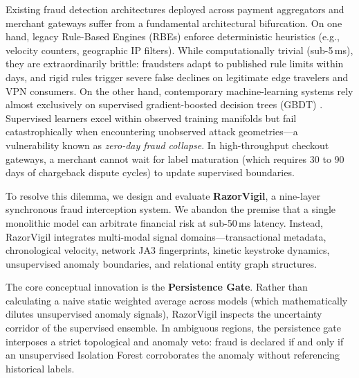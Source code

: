 \documentclass[conference]{IEEEtran}
\begin{document}
Existing fraud detection architectures deployed across payment aggregators and merchant gateways suffer from a fundamental architectural bifurcation. On one hand, legacy Rule-Based Engines (RBEs) enforce deterministic heuristics (e.g., velocity counters, geographic IP filters). While computationally trivial (sub-5\,ms), they are extraordinarily brittle: fraudsters adapt to published rule limits within days, and rigid rules trigger severe false declines on legitimate edge travelers and VPN consumers. On the other hand, contemporary machine-learning systems rely almost exclusively on supervised gradient-boosted decision trees (GBDT) \cite{chen2016xgboost, ke2017lightgbm, prokhorenkova2018catboost}. Supervised learners excel within observed training manifolds but fail catastrophically when encountering unobserved attack geometries---a vulnerability known as \textit{zero-day fraud collapse}. In high-throughput checkout gateways, a merchant cannot wait for label maturation (which requires 30 to 90 days of chargeback dispute cycles) to update supervised boundaries.

To resolve this dilemma, we design and evaluate \textbf{RazorVigil}, a nine-layer synchronous fraud interception system. We abandon the premise that a single monolithic model can arbitrate financial risk at sub-50\,ms latency. Instead, RazorVigil integrates multi-modal signal domains---transactional metadata, chronological velocity, network JA3 fingerprints, kinetic keystroke dynamics, unsupervised anomaly boundaries, and relational entity graph structures.

The core conceptual innovation is the \textbf{Persistence Gate}. Rather than calculating a naive static weighted average across models (which mathematically dilutes unsupervised anomaly signals), RazorVigil inspects the uncertainty corridor of the supervised ensemble. In ambiguous regions, the persistence gate interposes a strict topological and anomaly veto: fraud is declared if and only if an unsupervised Isolation Forest \cite{liu2008isolation} corroborates the anomaly without referencing historical labels.
\end{document}
